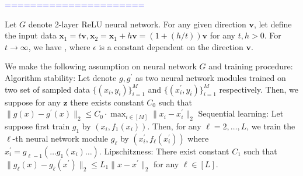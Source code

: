\textcolor{blue}{======================\\}

\begin{theorem}  \label{theorem:linear_extrapolation}
Let $G$ denote 2-layer ReLU neural network.
For any given direction $\mathbf{v}$, let define the input data $\mathbf{x}_1 = t\mathbf{v}, \mathbf{x}_2= \mathbf{x}_1 + h\mathbf{v} = (1+(h/t))\mathbf{v}$ for any $t,h > 0$. For $t\rightarrow \infty$, we have ,
where $\epsilon$ is a constant dependent on the direction $\mathbf{v}$.
\end{theorem}

\begin{assumption}\label{assumption:algorithmic_alignment_assmption}
We make the following assumption on neural network $G$ and training procedure:
 Algorithm stability: Let denote $g, g^\prime$ as two neural network modules trained on two set of sampled data $\{(x_i, y_i)\}_{i=1}^M$ and $\{(x_i^\prime, y_i)\}_{i=1}^M$ respectively. Then, we suppose for any $\mathbf{z}$ there exists constant $C_0$ such that $\| g(x) - g^\prime(x) \|_2 \leq C_0 \cdot \max_{i\in[M]} \| x_i - x_i^\prime \|_2$
 Sequential learning: Let suppose first train $g_1$ by $(x_i, f_1(x_i))$. Then, for any $\ell=2,\ldots, L$, we train the $\ell$-th neural network module $g_\ell$ by $(x_i^\prime, f_\ell(x_i^\prime))$ where $x_i^\prime = g_{\ell-1}(\ldots g_1(x_i)\ldots)$.
 Lipschitzness: There exist constant $C_1$ such that $\|g_\ell(x) - g_\ell(x^\prime)\|_2 \leq L_1 \|x - x^\prime \|_2$ for any $\ell\in[L]$.

\end{assumption}
